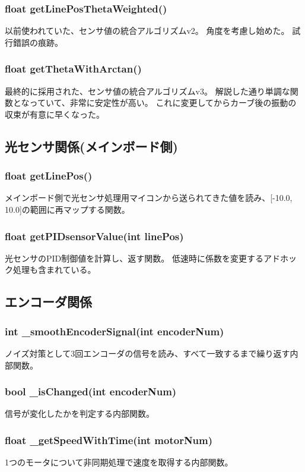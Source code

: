 \documentclass{ltjsreport}
\begin{document}
\subsubsection{float getLinePosThetaWeighted()}
以前使われていた、センサ値の統合アルゴリズムv2。
角度を考慮し始めた。
試行錯誤の痕跡。

\subsubsection{float getThetaWithArctan()}
最終的に採用された、センサ値の統合アルゴリズムv3。
解説した通り単調な関数となっていて、非常に安定性が高い。
これに変更してからカーブ後の振動の収束が有意に早くなった。

\subsection{光センサ関係(メインボード側)}
\subsubsection{float getLinePos()}
メインボード側で光センサ処理用マイコンから送られてきた値を読み、[-10.0, 10.0]の範囲に再マップする関数。
\subsubsection{float getPIDsensorValue(int linePos)}
光センサのPID制御値を計算し、返す関数。
低速時に係数を変更するアドホック処理も含まれている。



\subsection{エンコーダ関係}
\subsubsection{int \_smoothEncoderSignal(int encoderNum)}
ノイズ対策として3回エンコーダの信号を読み、すべて一致するまで繰り返す内部関数。
\subsubsection{bool \_isChanged(int encoderNum)}
信号が変化したかを判定する内部関数。
\subsubsection{float \_getSpeedWithTime(int motorNum)}
1つのモータについて非同期処理で速度を取得する内部関数。
\end{document}
